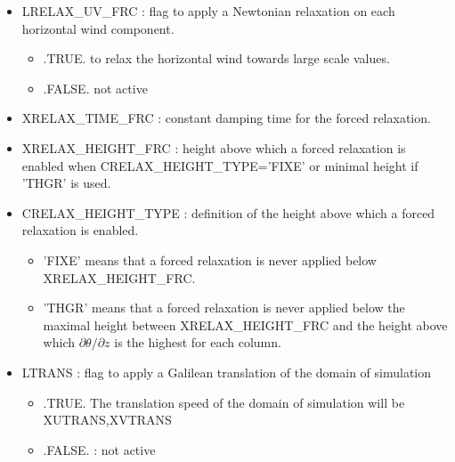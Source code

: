 \begin{itemize}
\item LRELAX\_UV\_FRC : flag to apply a Newtonian relaxation on each
horizontal wind component.
\begin{itemize}
\item .TRUE.  to relax the horizontal wind towards large scale values.
\item .FALSE. not active
\end{itemize}

\item XRELAX\_TIME\_FRC : constant damping time for the forced relaxation.

\item XRELAX\_HEIGHT\_FRC : height above which a forced relaxation is enabled
when CRELAX\_HEIGHT\_TYPE='FIXE' or minimal height if 'THGR' is used.

\item CRELAX\_HEIGHT\_TYPE : definition of the height above which a forced
relaxation is enabled.
\begin{itemize}
\item 'FIXE' means that a forced relaxation is never applied below
XRELAX\_HEIGHT\_FRC.
\item 'THGR' means that a forced relaxation is never applied below the maximal
height between XRELAX\_HEIGHT\_FRC and the height above which $\partial \theta
/ \partial z$ is the highest for each column.
\end{itemize}

\item LTRANS : flag to apply a Galilean translation of the domain 
of simulation
\begin{itemize}
\item  .TRUE. The translation speed of the domain of simulation will be 
XUTRANS,XVTRANS
\item .FALSE. : not active
\end{itemize}

\end{itemize}
